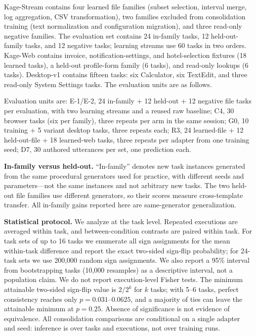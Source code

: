 \documentclass[
  10pt,
]{article}
\begin{document}
Kage-Stream contains four learned file families (subset selection,
interval merge, log aggregation, CSV transformation), two families
excluded from consolidation training (text normalization and
configuration migration), and three read-only negative families. The
evaluation set contains 24 in-family tasks, 12 held-out-family tasks,
and 12 negative tasks; learning streams use 60 tasks in two orders.
Kage-Web contains invoice, notification-settings, and hotel-selection
fixtures (18 learned tasks), a held-out profile-form family (6 tasks),
and read-only lookups (6 tasks). Desktop-v1 contains fifteen tasks: six
Calculator, six TextEdit, and three read-only System Settings tasks. The
evaluation units are as follows.

Evaluation units are: E-1/E-2, 24 in-family + 12 held-out + 12 negative
file tasks per evaluation, with two learning streams and a reused raw
baseline; C4, 30 browser tasks (six per family), three repeats per arm
in the same session; G0, 10 training + 5 variant desktop tasks, three
repeats each; R3, 24 learned-file + 12 held-out-file + 18 learned-web
tasks, three repeats per adapter from one training seed; D7, 30 authored
utterances per set, one prediction each.

\textbf{In-family versus held-out.} ``In-family'' denotes new task
instances generated from the same procedural generators used for
practice, with different seeds and parameters---not the same instances
and not arbitrary new tasks. The two held-out file families use
different generators, so their scores measure cross-template transfer.
All in-family gains reported here are same-generator generalization.

\textbf{Statistical protocol.} We analyze at the task level. Repeated
executions are averaged within task, and between-condition contrasts are
paired within task. For task sets of up to 16 tasks we enumerate all
sign assignments for the mean within-task difference and report the
exact two-sided sign-flip probability; for 24-task sets we use 200,000
random sign assignments. We also report a 95\% interval from
bootstrapping tasks (10,000 resamples) as a descriptive interval, not a
population claim. We do not report execution-level Fisher tests. The
minimum attainable two-sided sign-flip value is \(2/2^k\) for \(k\)
tasks; with 5--6 tasks, perfect consistency reaches only
\(p=0.031\)--\(0.0625\), and a majority of ties can leave the attainable
minimum at \(p=0.25\). Absence of significance is not evidence of
equivalence. All consolidation comparisons are conditional on a single
adapter and seed: inference is over tasks and executions, not over
training runs.
\end{document}
